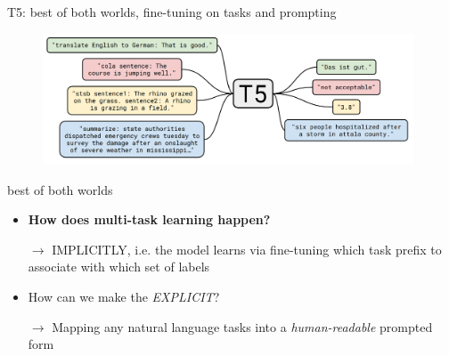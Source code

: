 
\begin{frame}{T5: best of both worlds, fine-tuning on tasks
and prompting}

\vfill
	
	\begin{figure}
		\centering
		\includegraphics[width = 11cm]{figure/62-t5.png}\\ 
	\end{figure}

\vfill

\end{frame}


\begin{frame}{best of both worlds}

\vfill

\begin{itemize}
    \item \ques \textbf{How does multi-task learning happen?}
    \item[$\to$] IMPLICITLY, i.e. the model learns via fine-tuning which task prefix to associate with which set of labels
    \item \ques How can we make the \textit{EXPLICIT}?
    \item[$\to$] Mapping any natural language tasks into a \textit{human-readable} prompted form 
\end{itemize}

\vfill

\end{frame}


